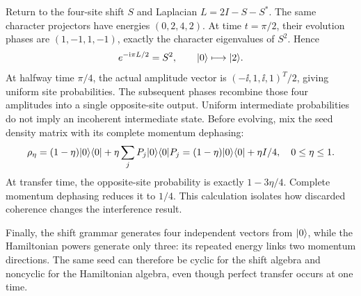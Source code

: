 Return to the four-site shift $S$ and Laplacian $L=2I-S-S^*$. The same character projectors have energies $(0,2,4,2)$. At time $t=\pi/2$, their evolution phases are $(1,-1,1,-1)$, exactly the character eigenvalues of $S^2$. Hence
\[
e^{-\mathrm i\pi L/2}=S^2,\qquad
\lvert 0\rangle\longmapsto\lvert 2\rangle.
\]
At halfway time $\pi/4$, the actual amplitude vector is $(-\ii,1,\ii,1)^T/2$, giving uniform site probabilities. The subsequent phases recombine those four amplitudes into a single opposite-site output. Uniform intermediate probabilities do not imply an incoherent intermediate state.
Before evolving, mix the seed density matrix with its complete momentum dephasing:
\[
\rho_\eta=(1-\eta)\lvert 0\rangle\langle 0\rvert+\eta\sum_jP_j\lvert 0\rangle\langle 0\rvert P_j
=(1-\eta)\lvert 0\rangle\langle 0\rvert+\eta I/4,
\quad0\le\eta\le1.
\]
At transfer time, the opposite-site probability is exactly $1-3\eta/4$. Complete momentum dephasing reduces it to $1/4$. This calculation isolates how discarded coherence changes the interference result.

Finally, the shift grammar generates four independent vectors from $\lvert 0\rangle$, while the Hamiltonian powers generate only three: its repeated energy links two momentum directions. The same seed can therefore be cyclic for the shift algebra and noncyclic for the Hamiltonian algebra, even though perfect transfer occurs at one time.

